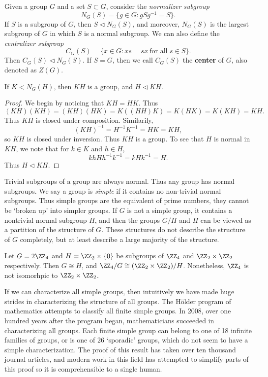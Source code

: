 \begin{example}
    Given a group $G$ and a set $S \subset G$, consider the \emph{normalizer subgroup}
    \[ N_G(S) = \{ g \in G : gSg^{-1} = S \}. \]
    If $S$ is a subgroup of $G$, then $S \lhd N_G(S)$, and moreover, $N_G(S)$ is the largest subgroup of $G$ in which $S$ is a normal subgroup. We can also define the \emph{centralizer subgroup}
    \[ C_G(S) = \{ x \in G: xs = sx\ \text{for all $s \in S$} \}. \]
    Then $C_G(S) \lhd N_G(S)$. If $S = G$, then we call $C_G(S)$ the {\bf center} of $G$, also denoted as $Z(G)$.
\end{example}

\begin{theorem}
    If $K < N_G(H)$, then $KH$ is a group, and $H \lhd KH$.
\end{theorem}
\begin{proof}
    We begin by noticing that $KH = HK$. Thus
    \[ (KH)(KH) = (KH)(HK) = K((HH)K) = K(HK) = K(KH) = KH. \]
    Thus $KH$ is closed under composition. Similarily,
    \[ (KH)^{-1} = H^{-1}K^{-1} = HK = KH, \]
    so $KH$ is closed under inversion. Thus $KH$ is a group. To see that $H$ is normal in $KH$, we note that for $k \in K$ and $h \in H$,
    \[ khHh^{-1}k^{-1} = kHk^{-1} = H. \]
    Thus $H \lhd KH$.
\end{proof}

Trivial subgroups of a group are always normal. Thus any group has normal subgroups. We say a group is \emph{simple} if it contains no non-trivial normal subgroups. Thus simple groups are the equivalent of prime numbers, they cannot be `broken up' into simpler groups. If $G$ is not a simple group, it contains a nontrivial normal subgroup $H$, and then the groups $G/H$ and $H$ can be viewed as a partition of the structure of $G$. These structures do not describe the structure of $G$ completely, but at least describe a large majority of the structure.

\begin{example}
    Let $G = 2 \ZZ_4$ and $H = \ZZ_2 \times \{ 0 \}$ be subgroups of $\ZZ_4$ and $\ZZ_2 \times \ZZ_2$ respectively. Then $G \cong H$, and $\ZZ_4/G \cong (\ZZ_2 \times \ZZ_2) / H$. Nonetheless, $\ZZ_4$ is not isomorhpic to $\ZZ_2 \times \ZZ_2$.
\end{example}

If we can characterize all simple groups, then intuitively we have made huge strides in characterizing the structure of all groups. The H\"{o}lder program of mathematics attempts to classify all finite simple groups. In 2008, over one hundred years after the program began, mathematicians succeeded in characterizing all groups. Each finite simple group can belong to one of 18 infinite families of groups, or is one of 26 `sporadic' groups, which do not seem to have a simple characterization. The proof of this result has taken over ten thousand journal articles, and modern work in this field has attempted to simplify parts of this proof so it is comprehensible to a single human.

